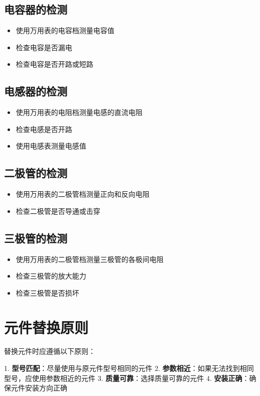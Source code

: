 \documentclass[12pt,UTF8]{ctexbook}
\begin{document}
\subsection{电容器的检测}\begin{itemize}
  \item 使用万用表的电容档测量电容值
  \item 检查电容是否漏电
  \item 检查电容是否开路或短路\end{itemize}

\subsection{电感器的检测}\begin{itemize}
  \item 使用万用表的电阻档测量电感的直流电阻
  \item 检查电感是否开路
  \item 使用电感表测量电感值\end{itemize}

\subsection{二极管的检测}\begin{itemize}
  \item 使用万用表的二极管档测量正向和反向电阻
  \item 检查二极管是否导通或击穿\end{itemize}

\subsection{三极管的检测}\begin{itemize}
  \item 使用万用表的二极管档测量三极管的各极间电阻
  \item 检查三极管的放大能力
  \item 检查三极管是否损坏\end{itemize}

\section{元件替换原则}

替换元件时应遵循以下原则：

1. \textbf{型号匹配}：尽量使用与原元件型号相同的元件
2. \textbf{参数相近}：如果无法找到相同型号，应使用参数相近的元件
3. \textbf{质量可靠}：选择质量可靠的元件
4. \textbf{安装正确}：确保元件安装方向正确
\end{document}
